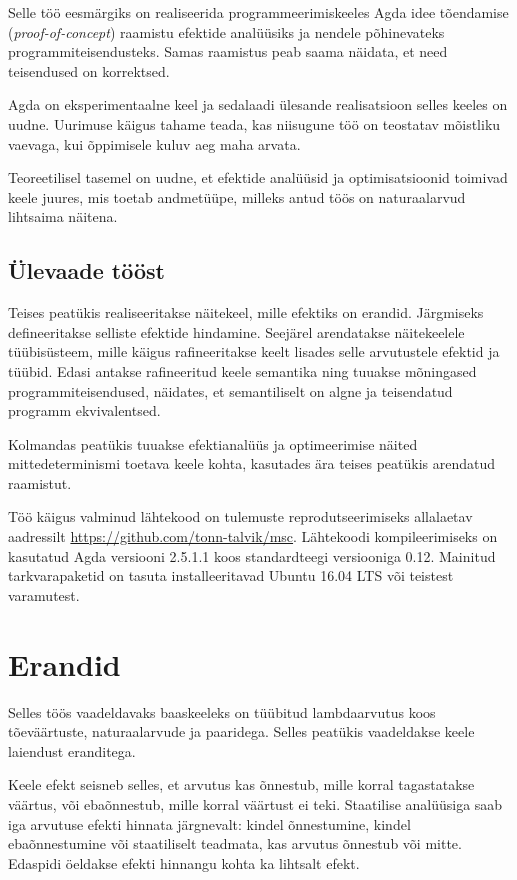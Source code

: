 \documentclass[a4paper,12pt]{article}
\begin{document}
Selle töö eesmärgiks on realiseerida programmeerimiskeeles Agda idee tõendamise (\emph{proof-of-concept}) 
raamistu efektide analüüsiks ja nendele põhinevateks programmiteisendusteks.
Samas raamistus peab saama näidata, et need teisendused on korrektsed.

Agda on eksperimentaalne keel ja sedalaadi ülesande realisatsioon selles keeles on uudne.
Uurimuse käigus tahame teada, kas niisugune töö on teostatav mõistliku vaevaga, kui õppimisele kuluv aeg maha arvata.

Teoreetilisel tasemel on uudne, et efektide analüüsid ja optimisatsioonid toimivad keele juures, mis toetab andmetüüpe, milleks antud töös on naturaalarvud lihtsaima näitena.

\subsection{Ülevaade tööst}
Teises peatükis realiseeritakse näitekeel, mille efektiks on erandid.
Järgmiseks defineeritakse selliste efektide hindamine.
Seejärel arendatakse näitekeelele tüübisüsteem, mille käigus rafineeritakse keelt lisades selle arvutustele efektid ja tüübid.
Edasi antakse rafineeritud keele semantika ning tuuakse mõningased programmiteisendused, näidates, et semantiliselt on algne ja teisendatud programm ekvivalentsed.

Kolmandas peatükis tuuakse efektianalüüs ja optimeerimise näited mittedeterminismi toetava keele kohta, kasutades ära teises peatükis arendatud raamistut.

Töö käigus valminud lähtekood on tulemuste reprodutseerimiseks allalaetav aadressilt \url{https://github.com/tonn-talvik/msc}.
Lähtekoodi kompileerimiseks on kasutatud Agda versiooni 2.5.1.1 koos standardteegi versiooniga 0.12.
Mainitud tarkvarapaketid on tasuta installeeritavad Ubuntu 16.04 LTS või teistest varamutest.

\clearpage\vspace*{0pt}

\section{Erandid}\label{sec:exc}

Selles töös vaadeldavaks baaskeeleks on tüübitud lambdaarvutus koos tõeväärtuste, naturaalarvude ja paaridega.
Selles peatükis vaadeldakse keele laiendust eranditega.

Keele efekt seisneb selles, et arvutus kas õnnestub, mille korral tagastatakse väärtus, või ebaõnnestub, mille korral väärtust ei teki.
Staatilise analüüsiga saab iga arvutuse efekti hinnata järgnevalt: kindel õnnestumine, kindel ebaõnnestumine või staatiliselt teadmata, kas arvutus õnnestub või mitte.
Edaspidi öeldakse efekti hinnangu kohta ka lihtsalt efekt.
\end{document}
